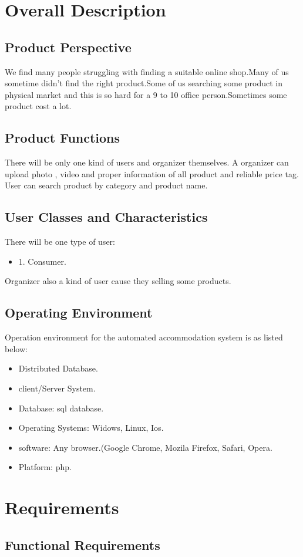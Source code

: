 \documentclass{article}
\begin{document}
\section{Overall Description}
\subsection{Product Perspective}
We find many people struggling with finding a suitable online shop.Many of us sometime didn't find the right product.Some of us searching some product in physical market and this is so hard for a 9 to 10 office person.Sometimes some product cost a lot.
\subsection{Product Functions}
There will be only one kind of users and organizer themselves. A organizer can upload photo , video and proper information of all product and reliable price tag. User can search product by category and product name.
\subsection{User Classes and Characteristics}
There will be one type of user:
\begin{itemize}
\item 1. Consumer.
\end{itemize}
Organizer also a kind of user cause they selling some products.
\subsection{Operating Environment}
Operation environment for the automated accommodation system is as listed below:
\begin{itemize}
\item Distributed Database.
\item client/Server System.
\item Database: sql database.
\item Operating Systems: Widows, Linux, Ios.
\item software: Any browser.(Google Chrome, Mozila Firefox, Safari, Opera.
\item Platform: php.
\end{itemize}
\section{Requirements}
\subsection{Functional Requirements}
\end{document}
